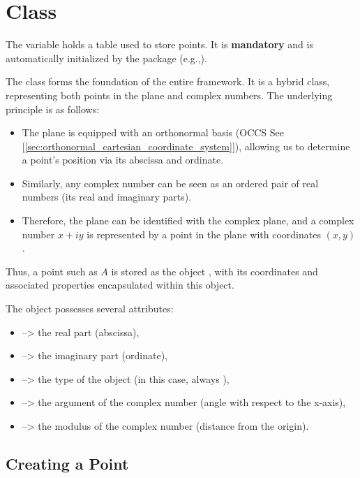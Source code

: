 \newpage

\section{Class } %
\label{sec:class_point}
The variable  holds a table used to store points. It is \textbf{mandatory} and is automatically initialized by the package (e.g.,).


\vspace{1em}
The  class forms the foundation of the entire framework. It is a hybrid class, representing both points in the plane and complex numbers. The underlying principle is as follows:

\begin{itemize}
  \item The plane is equipped with an orthonormal basis (OCCS See [\ref{sec:orthonormal_cartesian_coordinate_system}]), allowing us to determine a point's position via its abscissa and ordinate.
  \item Similarly, any complex number can be seen as an ordered pair of real numbers (its real and imaginary parts).
  \item Therefore, the plane can be identified with the complex plane, and a complex number $x + iy$ is represented by a point in the plane with coordinates $(x, y)$.
\end{itemize}

Thus, a point such as $A$ is stored as the object , with its coordinates and associated properties encapsulated within this object.

\vspace{1em}
The  object possesses several attributes:
\begin{itemize}
  \item {} --> the real part (abscissa),
  \item {} --> the imaginary part (ordinate),
  \item {} --> the type of the object (in this case, always ),
  \item {} --> the argument of the complex number (angle with respect to the x-axis),
  \item {} --> the modulus of the complex number (distance from the origin).
\end{itemize}


\subsection{Creating a Point} %
\label{sub:creating_a_point}

